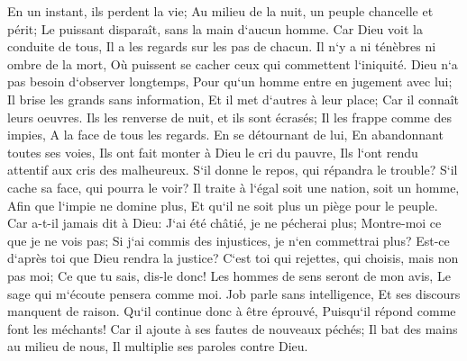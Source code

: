 \verse En un instant, ils perdent la vie; Au milieu de la nuit, un peuple chancelle et périt; Le puissant disparaît, sans la main d`aucun homme. 
\verse Car Dieu voit la conduite de tous, Il a les regards sur les pas de chacun. 
\verse Il n`y a ni ténèbres ni ombre de la mort, Où puissent se cacher ceux qui commettent l`iniquité. 
\verse Dieu n`a pas besoin d`observer longtemps, Pour qu`un homme entre en jugement avec lui; 
\verse Il brise les grands sans information, Et il met d`autres à leur place; 
\verse Car il connaît leurs oeuvres. Ils les renverse de nuit, et ils sont écrasés; 
\verse Il les frappe comme des impies, A la face de tous les regards. 
\verse En se détournant de lui, En abandonnant toutes ses voies, 
\verse Ils ont fait monter à Dieu le cri du pauvre, Ils l`ont rendu attentif aux cris des malheureux. 
\verse S`il donne le repos, qui répandra le trouble? S`il cache sa face, qui pourra le voir? Il traite à l`égal soit une nation, soit un homme, 
\verse Afin que l`impie ne domine plus, Et qu`il ne soit plus un piège pour le peuple. 
\verse Car a-t-il jamais dit à Dieu: J`ai été châtié, je ne pécherai plus; 
\verse Montre-moi ce que je ne vois pas; Si j`ai commis des injustices, je n`en commettrai plus? 
\verse Est-ce d`après toi que Dieu rendra la justice? C`est toi qui rejettes, qui choisis, mais non pas moi; Ce que tu sais, dis-le donc! 
\verse Les hommes de sens seront de mon avis, Le sage qui m`écoute pensera comme moi. 
\verse Job parle sans intelligence, Et ses discours manquent de raison. 
\verse Qu`il continue donc à être éprouvé, Puisqu`il répond comme font les méchants! 
\verse Car il ajoute à ses fautes de nouveaux péchés; Il bat des mains au milieu de nous, Il multiplie ses paroles contre Dieu. 

